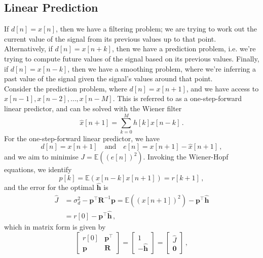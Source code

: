 \subsection{Linear Prediction}
%
If $d[n] = x[n]$, then we have a filtering problem; we are trying to
work out the current value of the signal from its previous values
up to that point. Alternatively, if $d[n] = x[n+k]$, then we have
a prediction problem, i.e. we're trying to compute future values of
the signal based on its previous values. Finally, if $d[n] = x[n-k]$,
then we have a smoothing problem, where we're inferring a past value
of the signal given the signal's values around that point.\\
%
Consider the prediction problem, where $d[n] = x[n+1]$, and we have
access to $x[n-1],x[n-2],\hdots,x[n-M]$. This is referred to as a
one-step-forward linear predictor, and can be solved with the
Wiener filter
%
\begin{displaymath}
  \hat{x}[n+1] = \sum_{k=0}^M h[k]x[n-k] \,.
\end{displaymath}
%
For the one-step-forward linear predictor, we have
%
\begin{displaymath}
  d[n] = x[n+1] \quad\mathrm{and}\quad e[n] = x[n+1] - \hat{x}[n+1] \,,
\end{displaymath}
%
and we aim to minimise $J = \mathbb{E}\left((e[n])^2\right)$. Invoking
the Wiener-Hopf equations, we identify
%
\begin{displaymath}
  p[k] = \mathbb{E}\left(x[n-k]x[n+1]\right) = r[k+1] \,,
\end{displaymath}
%
and the error for the optimal $\hat{\mathbf{h}}$ is
%
\begin{align*}
  \hat{J} &= \sigma_d^2 - \mathbf{p}^\top\mathbf{R}^{-1}\mathbf{p}
  = \mathbb{E}\left((x[n+1])^2\right) - \mathbf{p}^\top\hat{\mathbf{h}} \\
  &= r[0] - \mathbf{p}^\top\hat{\mathbf{h}} \,,
\end{align*}
%
which in matrix form is given by
%
\begin{displaymath}
  \left[\begin{array}{cc}
      r[0] & \mathbf{p}^\top \\
      \mathbf{p} & \mathbf{R}
    \end{array}\right] = \left[\begin{array}{c}
      1 \\ -\hat{\mathbf{h}}
    \end{array}\right] = \left[\begin{array}{c}
      \hat{J} \\ \mathbf{0}
    \end{array}\right] \,,
\end{displaymath}
